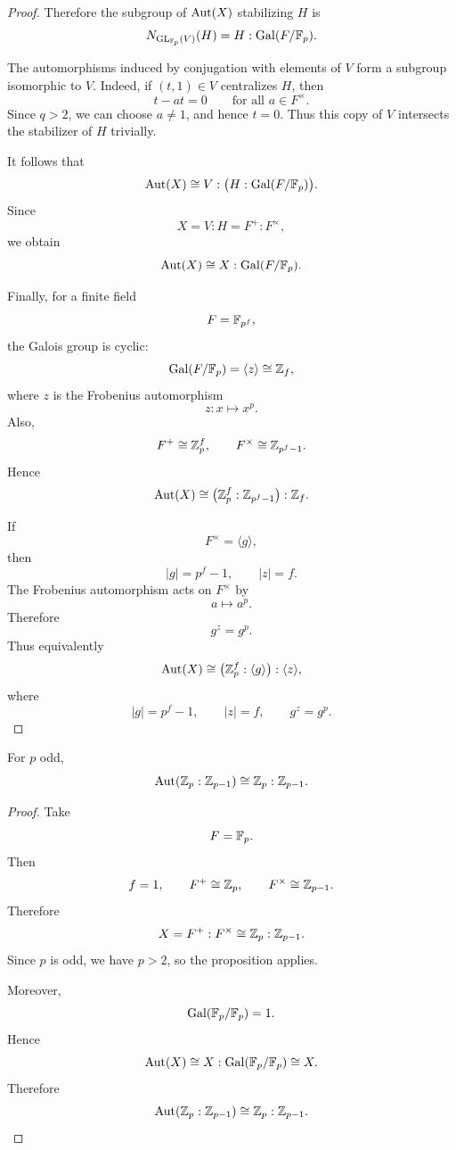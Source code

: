 \begin{proof}
    Therefore the subgroup of \(\operatorname{Aut}(X)\) stabilizing \(H\) is
    \[
        N_{\operatorname{GL}_{\mathbb{F}_p}(V)}(H)
        =
        H:\operatorname{Gal}(F/\mathbb{F}_p).
    \]
    
    The automorphisms induced by conjugation with elements of \(V\) form a subgroup isomorphic to \(V\). Indeed, if \((t,1)\in V\) centralizes \(H\), then
    \[
        t-at=0
        \qquad
        \text{for all }a\in F^\times.
    \]
    Since \(q>2\), we can choose \(a\neq 1\), and hence \(t=0\). Thus this copy of \(V\) intersects the stabilizer of \(H\) trivially.
    
    It follows that
    \[
        \operatorname{Aut}(X)
        \cong
        V:\bigl(H:\operatorname{Gal}(F/\mathbb{F}_p)\bigr).
    \]
    Since
    \[
        X=V:H=F^+:F^\times,
    \]
    we obtain
    \[
        \operatorname{Aut}(X)
        \cong
        X:\operatorname{Gal}(F/\mathbb{F}_p).
    \]
    
    Finally, for a finite field
    \[
        F=\mathbb{F}_{p^f},
    \]
    the Galois group is cyclic:
    \[
        \operatorname{Gal}(F/\mathbb{F}_p)
        =
        \langle z\rangle
        \cong
        \mathbb{Z}_f,
    \]
    where \(z\) is the Frobenius automorphism
    \[
        z:x\longmapsto x^p.
    \]
    Also,
    \[
        F^+\cong \mathbb{Z}_p^f,
        \qquad
        F^\times\cong \mathbb{Z}_{p^f-1}.
    \]
    Hence
    \[
        \operatorname{Aut}(X)
        \cong
        \bigl(\mathbb{Z}_p^f:\mathbb{Z}_{p^f-1}\bigr):\mathbb{Z}_f.
    \]
    
    If
    \[
        F^\times=\langle g\rangle,
    \]
    then
    \[
        |g|=p^f-1,
        \qquad
        |z|=f.
    \]
    The Frobenius automorphism acts on \(F^\times\) by
    \[
        a\longmapsto a^p.
    \]
    Therefore
    \[
        g^z=g^p.
    \]
    Thus equivalently
    \[
        \operatorname{Aut}(X)
        \cong
        \bigl(\mathbb{Z}_p^f:\langle g\rangle\bigr):\langle z\rangle,
    \]
    where
    \[
        |g|=p^f-1,
        \qquad
        |z|=f,
        \qquad
        g^z=g^p.
    \]
    \end{proof}

\begin{corollary}
For $p$ odd,
\[
    \operatorname{Aut}(\mathbb{Z}_p:\mathbb{Z}_{p-1})
    \cong
    \mathbb{Z}_p:\mathbb{Z}_{p-1}.
\]
\end{corollary}


    
    \begin{proof}
    Take
    \[
        F=\mathbb{F}_p.
    \]
    Then
    \[
        f=1,
        \qquad
        F^+\cong \mathbb{Z}_p,
        \qquad
        F^\times\cong \mathbb{Z}_{p-1}.
    \]
    Therefore
    \[
        X=F^+:F^\times
        \cong
        \mathbb{Z}_p:\mathbb{Z}_{p-1}.
    \]
    Since \(p\) is odd, we have \(p>2\), so the proposition applies.
    
    Moreover,
    \[
        \operatorname{Gal}(\mathbb{F}_p/\mathbb{F}_p)=1.
    \]
    Hence
    \[
        \operatorname{Aut}(X)
        \cong
        X:\operatorname{Gal}(\mathbb{F}_p/\mathbb{F}_p)
        \cong
        X.
    \]
    Therefore
    \[
        \operatorname{Aut}(\mathbb{Z}_p:\mathbb{Z}_{p-1})
        \cong
        \mathbb{Z}_p:\mathbb{Z}_{p-1}.
    \]
    \end{proof}

